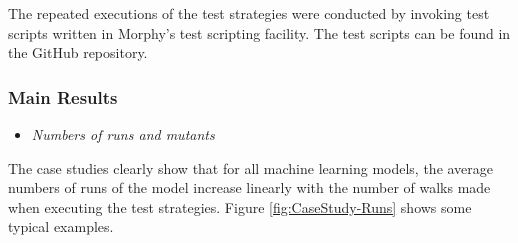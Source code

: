 \documentclass[preprint,1p,authoryear,times]{elsarticle}
\begin{document}
The repeated executions of the test strategies were conducted by invoking test scripts written in Morphy's test scripting facility. The test scripts can be found in the GitHub repository. 

\subsubsection{Main Results}


\begin{itemize}
\item \emph{Numbers of runs and mutants}
\end{itemize}

 The case studies clearly show that for all machine learning models, the average numbers of runs of the model increase linearly with the number of walks made when executing the test strategies. Figure \ref{fig:CaseStudy-Runs} shows some typical examples. 
\end{document}
